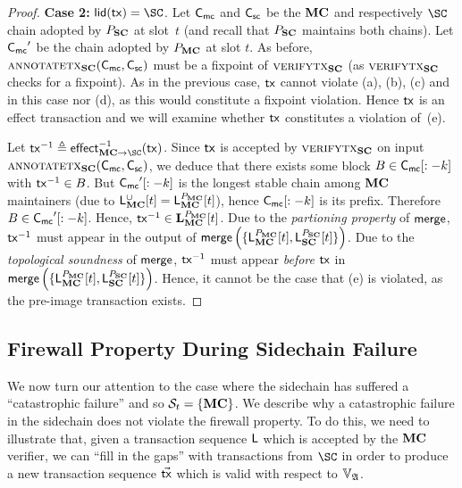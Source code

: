 \begin{proof}
  \textbf{Case 2: } $\llid(\tx) = \SC$.
  Let $\Chainmc$ and $\Chainsc$ be the $\MC$ and respectively $\SC$ chain
  adopted by $\party_\Sidechain$ at slot~$t$ (and recall that $\party_\Sidechain$ maintains
  both chains). Let $\Chainmc'$ be the chain adopted by
  $\party_\MC$ at slot $t$. As before,
  $\textsc{annotatetx}_\Sidechain(\Chainmc,\Chainsc)$ must be a fixpoint of
  $\textsc{verifytx}_\Sidechain$ (as $\textsc{verifytx}_\Sidechain$ checks for a fixpoint).
  As in the previous case, $\tx$ cannot violate (a), (b), (c) and in this case
  nor (d), as this would constitute a fixpoint violation. Hence $\tx$ is an
  effect transaction and we will examine whether $\tx$ constitutes a violation
  of~(e).

  Let $\tx^{-1} \defeq \eff{\MC}{\SC}^{-1}(\tx)$. Since $\tx$ is accepted
  by $\textsc{verifytx}_\Sidechain$ on input
  $\textsc{annotatetx}_\Sidechain(\Chainmc,\Chainsc)$, we deduce that
  there exists some block $B \in \Chainmc[:-k]$
  with $\tx^{-1} \in B$. But $\Chainmc'[:-k]$
  is the longest stable chain among
  $\MC$ maintainers (due to $\LState_\MC^\cup[t] = \LState_\MC^{\party_\MC}[t]$),
  hence $\Chainmc[:-k]$ is its prefix. Therefore
  $B \in \Chainmc'[:-k]$.
  Hence, $\tx^{-1} \in \Ledger^{\party_\MC}_\MC[t]$.
  Due to the \emph{partioning property} of $\merge$, $\tx^{-1}$ must appear in
  the output of $\merge\left(
      \{\LState_\MC^{\party_\MC}[t], \LState_\Sidechain^{\party_\Sidechain}[t]\}
  \right)$.
  Due to the
  \emph{topological soundness} of $\merge$, $\tx^{-1}$ must appear
  \emph{before} $\tx$
  in
  $\merge\left(
      \{\LState_\MC^{\party_\MC}[t], \LState_\Sidechain^{\party_\Sidechain}[t]\}
  \right)$. Hence, it cannot be the case that (e) is violated, as the pre-image
  transaction exists.
\end{proof}

\subsection{Firewall Property During Sidechain Failure}


We now turn our attention to the case where the sidechain has suffered a
``catastrophic failure'' and so $\Secure_t = \{\MC\}$. We describe why a
catastrophic failure in the sidechain does not violate the firewall property. To
do this, we need to illustrate that, given a transaction sequence $\LState$ which is
accepted by the $\MC$ verifier, we can ``fill in the gaps'' with transactions
from $\SC$ in order to produce a new transaction sequence $\vec\tx$ which is
valid with respect to $\adalang$.

